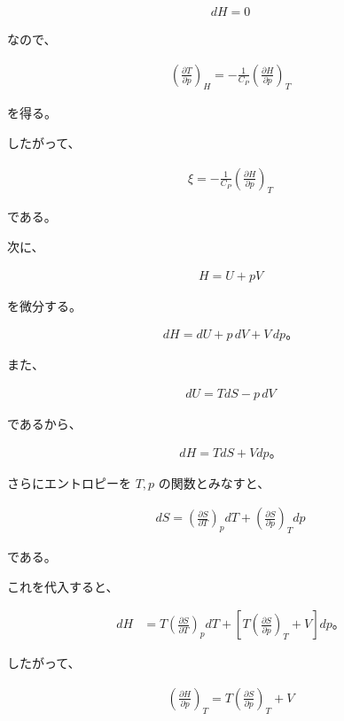 \documentclass[platex,dvipdfmx,a4paper]{jsarticle}
\begin{document}
\begin{align*}
dH=0
\end{align*}

なので、

\begin{align*}
\left(
\frac{\partial T}{\partial p}
\right)_H
=
-\frac1{C_P}
\left(
\frac{\partial H}{\partial p}
\right)_T
\end{align*}

を得る。

したがって、

\begin{align*}
\xi
=
-\frac1{C_P}
\left(
\frac{\partial H}{\partial p}
\right)_T
\end{align*}

である。

次に、

\begin{align*}
H=U+pV
\end{align*}

を微分する。

\begin{align*}
dH
=
dU+p\,dV+V\,dp。
\end{align*}

また、

\begin{align*}
dU
=
TdS-p\,dV
\end{align*}

であるから、

\begin{align*}
dH
=
TdS+Vdp。
\end{align*}

さらにエントロピーを $T,p$ の関数とみなすと、

\begin{align*}
dS
=
\left(
\frac{\partial S}{\partial T}
\right)_p dT
+
\left(
\frac{\partial S}{\partial p}
\right)_T dp
\end{align*}

である。

これを代入すると、

\begin{align*}
dH
&=
T
\left(
\frac{\partial S}{\partial T}
\right)_p dT
+
\left[
T
\left(
\frac{\partial S}{\partial p}
\right)_T
+
V
\right]dp。
\end{align*}

したがって、

\begin{align*}
\left(
\frac{\partial H}{\partial p}
\right)_T
=
T
\left(
\frac{\partial S}{\partial p}
\right)_T
+
V
\end{align*}
\end{document}
